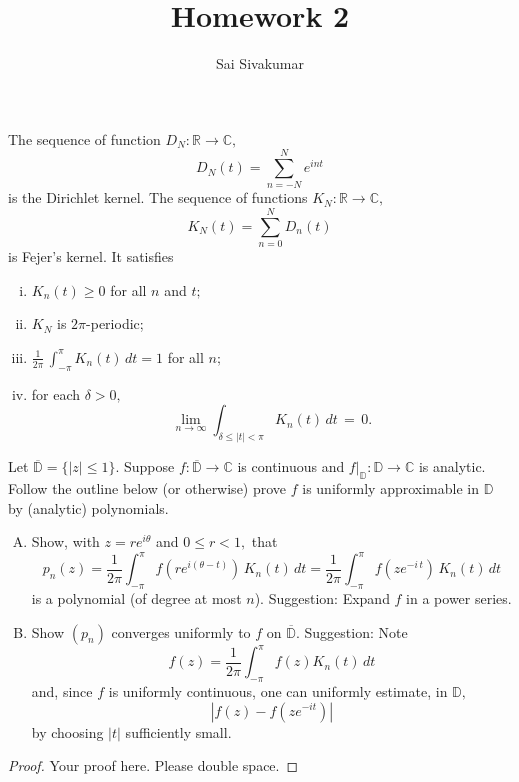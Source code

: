 \documentclass[12pt]{amsart}
\title{Homework 2}
\author{Sai Sivakumar}
\newcommand{\RR}{\mathbb{R}}
\newcommand{\CC}{\mathbb{C}}
\newcommand{\DD}{\mathbb{D}}
\begin{document}
\maketitle

\thispagestyle{empty}
The sequence of function $D_N:\RR\to \CC,$  
\[
 D_N(t) = \sum_{n=-N}^N e^{int}
\]
 is the Dirichlet kernel. The sequence of functions $K_N:\RR\to \CC,$ 
\[
 K_N(t) =   \sum_{n=0}^N D_n(t) 
\]
 is Fejer's kernel. It satisfies
\begin{enumerate}[(i)]
 \item $K_n(t)\ge 0$ for all $n$ and $t;$
 \item $K_N$ is $2\pi$-periodic;
 \item  $\frac{1}{2\pi}\, \int_{-\pi}^{\pi} K_n(t)\, dt = 1$ for all $n;$ 
 \item  for each $\delta>0,$
\[
  \lim_{n\to\infty} \int_{\delta \le |t|<\pi} K_n(t)\, dt \, = \, 0.
\]
\end{enumerate}
\bigskip

Let $\overline{\DD}=\{|z| \le 1\}.$ Suppose $f:\overline{\DD}\to \CC$ is continuous and $f|_{\DD}:\DD\to\CC$ is analytic. Follow the outline below
(or otherwise) prove $f$ is uniformly approximable in $\DD$  by (analytic)  polynomials.

\begin{enumerate}[(A)]\itemsep=10pt
 \item  Show, with 
 $z=re^{i\theta}$ and $0\le r<1,$ that
\[
 p_n(z) =\frac{1}{2\pi} \int_{-\pi}^\pi f(re^{i(\theta -t)})\, K_n(t)\, dt
  = \frac{1}{2\pi} \int_{-\pi}^\pi f(ze^{-i\, t})\, K_n(t)\, dt
\]
 is a polynomial  (of degree at most $n$). Suggestion: Expand $f$ in a power series.
\item Show $(p_n)$ converges uniformly to $f$ on $\overline{\DD}.$ Suggestion: Note
\[
 f(z) =\frac{1}{2\pi}\int_{-\pi}^\pi f(z) K_n(t)\, dt 
\]
and, since $f$ is uniformly continuous, one can uniformly estimate, in  $\DD,$ 
\[
    |f(z)-f(ze^{-it})|
\]
 by choosing $|t|$ sufficiently small.  
\end{enumerate}

 \bigskip

\begin{proof}
\baselineskip=24pt
Your proof here. Please double space.
\end{proof}
\end{document}
